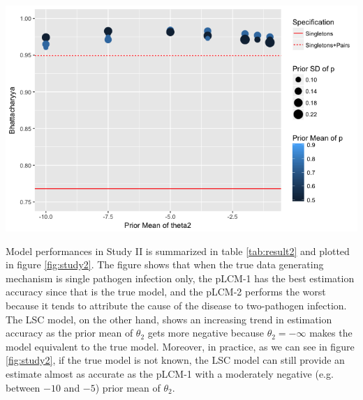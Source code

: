 \documentclass[11 pt, a4paper]{article}  %
\begin{document}
\begin{center}
\includegraphics[scale=0.6]{StudyI.png}
\label{fig:study1}
\end{center}




Model performances in Study II is summarized in table \ref{tab:result2} and plotted in figure \ref{fig:study2}. The figure shows that when the true data generating mechanism is single pathogen infection only, the pLCM-1 has the best estimation accuracy since that is the true model, and the pLCM-2 performs the worst because it tends to attribute the cause of the disease to two-pathogen infection. The LSC model, on the other hand, shows an increasing trend in estimation accuracy as the prior mean of $\theta_2$ gets more negative because $\theta_2 = -\infty$ makes the model equivalent to the true model. Moreover, in practice, as we can see in figure \ref{fig:study2}, if the true model is not known, the LSC model can still provide an estimate almost as accurate as the pLCM-1 with a moderately negative (e.g. between $-10$ and $-5$) prior mean of $\theta_2$.\\
\end{document}
